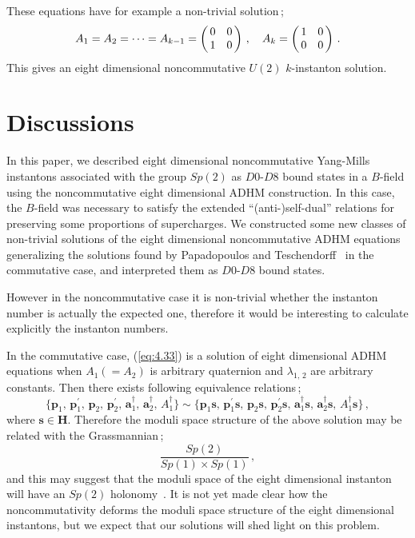\documentclass[a4paper,12pt]{article}
\begin{document}
These equations have for example a non-trivial solution\,;
\begin{equation}
A_{1} =A_{2}=\cdots =A_{k-1}= \left( \begin{array}{@{\,}cc@{\,}}
   0   &    0     \\
   1   &    0 
  \end{array}  \right)\,,\quad  A_{k} =
\left( \begin{array}{@{\,}cc@{\,}}
   1   &    0     \\
   0   &    0 
  \end{array}  \right)\,.
\end{equation}
 This gives an eight dimensional noncommutative 
$U(2)$ $k$-instanton solution.




\section{Discussions}

In this paper, 
we described eight dimensional noncommutative 
Yang-Mills instantons associated with the group $Sp(2)$ 
as $D0$-$D8$ bound states in a $B$-field
using the noncommutative eight dimensional ADHM construction. 
In this case, the $B$-field was necessary to satisfy the extended 
``(anti-)self-dual'' relations for preserving some proportions of supercharges.
We constructed some new classes of non-trivial solutions 
of the eight dimensional noncommutative ADHM equations 
generalizing the solutions found by Papadopoulos and Teschendorff~\cite{pt} 
in the commutative case, 
and interpreted them as $D0$-$D8$ bound states.

However in the noncommutative case 
it is non-trivial whether the instanton number 
is actually the expected one, therefore it would be interesting to calculate  
explicitly the instanton numbers.

In the commutative case, (\ref{eq:4.33}) is a solution of eight dimensional 
ADHM equations when $A_{1}(=A_{2})$ is 
arbitrary quaternion and $\lambda_{1,\,2}$ 
are arbitrary constants. Then there exists following equivalence relations\,;
\[  \{ \mathbf{p}_{1},\,\mathbf{p}_1^{\prime},\,\mathbf{p}_{2},\,
\mathbf{p}_2^{\prime},\,\mathbf{a}_1^{\dagger},\,\mathbf{a}_2^{\dagger} ,\,
A_1^{\dagger}\}
\sim  \{ \mathbf{p}_{1}\mathbf{s},\,\mathbf{p}_1^{\prime}\mathbf{s},\,
\mathbf{p}_{2}\mathbf{s},\,
\mathbf{p}_2^{\prime}\mathbf{s},\,\mathbf{a}_1^{\dagger}\mathbf{s},\,
\mathbf{a}_2^{\dagger}\mathbf{s},\,A_1^{\dagger}\mathbf{s} \}\,,\]
where $\mathbf{s}\in \mathbf{H}$. 
Therefore the moduli space structure of the above solution  
may be related with the Grassmannian\,;
\[  \frac{Sp(2)}{Sp(1)\times Sp(1)} \,, \] 
and this may suggest that the moduli space of the eight dimensional 
instanton will have an $Sp(2)$ holonomy~\cite{ohta}. 
It is not yet made clear 
how the noncommutativity deforms the moduli space structure of 
the eight dimensional instantons, but 
we expect that our solutions will shed light on this problem. 
\end{document}

